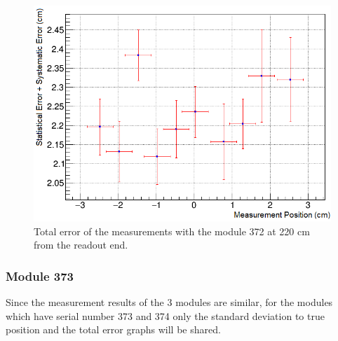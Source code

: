 \documentclass[a4paper]{article}\linespread{1.4}
\begin{document}
\begin{figure}[h!] \hspace*{-0cm} \includegraphics[width=120mm,scale=2.0]{72fe.png} \caption{Total error of the measurements with the module 372 at 220 cm from the readout end.}  \label{fig:72fe}\end{figure}

\subsubsection{Module 373} 
Since the measurement results of the 3 modules are similar, for the modules which have serial number 373 and 374 only the standard deviation to true position and the total error graphs will be shared.
\end{document}
